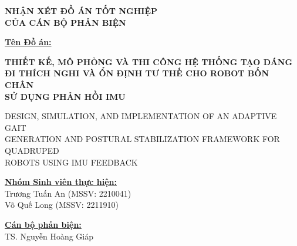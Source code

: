 \documentclass[12pt,a4paper]{article}
\begin{document}
\begin{center}
    {\large \textbf{NHẬN XÉT ĐỒ ÁN TỐT NGHIỆP}} \\[0.1cm]
    {\large \textbf{CỦA CÁN BỘ PHẢN BIỆN}}
\end{center}

\vspace{0.2cm}

\noindent \underline{\textbf{Tên Đồ án:}}

\vspace{0.2cm}

\begin{center}
    {\large \textbf{THIẾT KẾ, MÔ PHỎNG VÀ THI CÔNG HỆ THỐNG TẠO DÁNG \\
    ĐI THÍCH NGHI VÀ ỔN ĐỊNH TƯ THẾ CHO ROBOT BỐN CHÂN \\
    SỬ DỤNG PHẢN HỒI IMU}}
    
    \vspace{0.1cm}
    {\small DESIGN, SIMULATION, AND IMPLEMENTATION OF AN ADAPTIVE GAIT \\
    GENERATION AND POSTURAL STABILIZATION FRAMEWORK FOR QUADRUPED \\
    ROBOTS USING IMU FEEDBACK}
\end{center}

\vspace{0.3cm}

\noindent
\begin{minipage}[t]{0.55\textwidth}
    \underline{\textbf{Nhóm Sinh viên thực hiện:}} \\[0.1cm]
    {\small Trương Tuấn An (MSSV: 2210041)}\\
    {\small Võ Quế Long (MSSV: 2211910)}
\end{minipage}
\hfill
\begin{minipage}[t]{0.4\textwidth}
    \underline{\textbf{Cán bộ phản biện:}} \\[0.1cm]
    {\small TS. Nguyễn Hoàng Giáp}
\end{minipage}

\vspace{0.4cm}
\end{document}
